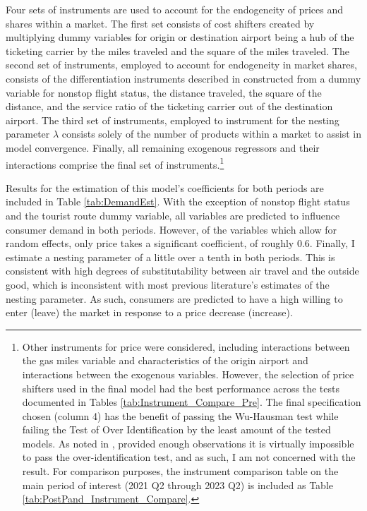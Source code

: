 \documentclass{article}
\begin{document}
	 Four sets of instruments are used to account for the endogeneity of prices and shares within a market. The first set consists of cost shifters created by multiplying dummy variables for origin or destination airport being a hub of the ticketing carrier by the miles traveled and the square of the miles traveled. The second set of instruments, employed to account for endogeneity in market shares, consists of the differentiation instruments described in \citet{gandhi_measuring_2019} constructed from a dummy variable for nonstop flight status, the distance traveled, the square of the distance, and the service ratio of the ticketing carrier out of the destination airport. The third set of instruments, employed to instrument for the nesting parameter $\lambda$ consists solely of the number of products within a market to assist in model convergence. Finally, all remaining exogenous regressors and their interactions comprise the final set of instruments.\footnote{Other instruments for price were considered, including interactions between the gas miles variable and characteristics of the origin airport and interactions between the exogenous variables. However, the selection of price shifters used in the final model had the best performance across the tests documented in Tables \ref{tab:Instrument_Compare_Pre}. The final specification chosen (column 4) has the benefit of passing the Wu-Hausman test while failing the Test of Over Identification by the least amount of the tested models. As noted in \citet{nevo_measuring_2001}, provided enough observations it is virtually impossible to pass the over-identification test, and as such, I am not concerned with the result. For comparison purposes, the instrument comparison table on the main period of interest (2021 Q2 through 2023 Q2) is included as Table \ref{tab:PostPand_Instrument_Compare}.}
	
    Results for the estimation of this model's coefficients for both periods are included in Table \ref{tab:DemandEst}. With the exception of nonstop flight status and the tourist route dummy variable, all variables are predicted to influence consumer demand in both periods. However, of the variables which allow for random effects, only price takes a significant coefficient, of roughly $0.6$. Finally, I estimate a nesting parameter of a little over a tenth in both periods. This is consistent with high degrees of substitutability between air travel and the outside good, which is inconsistent with most previous literature's estimates of the nesting parameter. As such, consumers are predicted to have a high willing to enter (leave) the market in response to a price decrease (increase).
\end{document}
